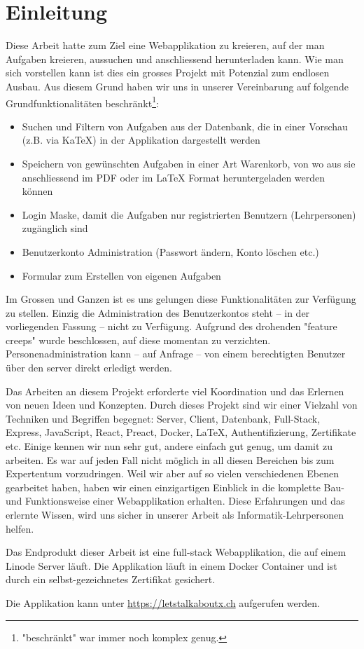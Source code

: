 
\section{Einleitung}

Diese Arbeit hatte zum Ziel eine Webapplikation zu kreieren, auf der man Aufgaben kreieren, aussuchen und anschliessend herunterladen kann. Wie man sich vorstellen kann ist dies ein grosses Projekt mit Potenzial zum endlosen Ausbau. Aus diesem Grund haben wir uns in unserer Vereinbarung auf folgende Grundfunktionalitäten beschränkt\footnote{"beschränkt" war immer noch komplex genug.}:
\begin{itemize}
  \item Suchen und Filtern von Aufgaben aus der Datenbank, die in einer Vorschau (z.B. via KaTeX) in der Applikation dargestellt werden
  \item Speichern von gewünschten Aufgaben in einer Art Warenkorb, von wo aus sie anschliessend im PDF oder im LaTeX Format heruntergeladen werden können
  \item Login Maske, damit die Aufgaben nur registrierten Benutzern (Lehrpersonen) zugänglich sind
  \item Benutzerkonto Administration (Passwort ändern, Konto löschen etc.)
  \item Formular zum Erstellen von eigenen Aufgaben
\end{itemize}

Im Grossen und Ganzen ist es uns gelungen diese Funktionalitäten zur Verfügung zu stellen. Einzig die Administration des Benutzerkontos steht -- in der vorliegenden Fassung -- nicht zu Verfügung. Aufgrund des drohenden "feature creeps" wurde beschlossen, auf diese momentan zu verzichten. Personenadministration kann -- auf Anfrage -- von einem berechtigten Benutzer über den server direkt erledigt werden.

Das Arbeiten an diesem Projekt erforderte viel Koordination und das Erlernen von neuen Ideen und Konzepten.  Durch dieses Projekt sind wir einer Vielzahl von Techniken und Begriffen begegnet: Server, Client, Datenbank, Full-Stack, Express, JavaScript, React, Preact, Docker, \LaTeX, Authentifizierung, Zertifikate etc. Einige kennen wir nun sehr gut, andere einfach gut genug, um damit zu arbeiten. Es war auf jeden Fall nicht möglich in all diesen Bereichen bis zum Expertentum vorzudringen. Weil wir aber auf so vielen verschiedenen Ebenen gearbeitet haben, haben wir einen einzigartigen Einblick in die komplette Bau- und Funktionsweise einer Webapplikation erhalten. Diese Erfahrungen und das erlernte Wissen, wird uns sicher in unserer Arbeit als Informatik-Lehrpersonen helfen.

Das Endprodukt dieser Arbeit ist eine full-stack Webapplikation, die auf einem Linode Server läuft. Die Applikation läuft in einem Docker Container und ist durch ein selbst-gezeichnetes Zertifikat gesichert.

Die Applikation kann unter \url{https://letstalkaboutx.ch} aufgerufen werden.